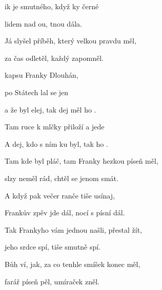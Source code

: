 

\zs
{}ik je smutného,
když ky černé 

lidem nad ou, tnou dála.

Já slyšel příběh, který velkou pravdu měl,

za čas odletěl, každý zapomněl.
\ks

\zr
{} kapsu  Franky Dlouhán,

po Státech lal se jen 

a že byl elej, tak dej měl ho .

Tam ruce k  mlčky přiloží
a 
jede 

A dej, kdo s ním
ku byl, tak ho  .
\kr

\zs
Tam kde byl pláč, tam Franky hezkou píseň měl,

slzy neměl rád, chtěl se jenom smát.

A když pak večer ranče tiše usínaj,

Frankův zpěv jde dál, nocí s písní dál.
\ks

\zr \kr

\zs
Tak Frankyho vám jednou našli, přestal žít,

jeho srdce spí, tiše smutně spí.

Bůh ví, jak, za co tenhle smíšek konec měl,

farář píseň pěl, umíraček zněl.
\ks
\kp









